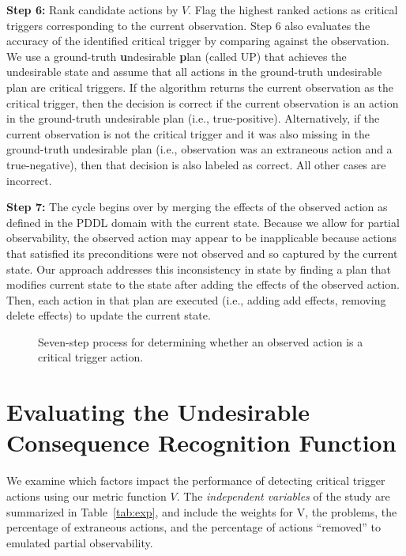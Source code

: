 \textbf{Step 6:} Rank candidate actions by $V$. Flag the highest ranked actions as critical triggers corresponding to the current observation. Step 6 also evaluates the accuracy of the identified critical trigger by comparing against the observation. 
We use a ground-truth \textbf{u}ndesirable \textbf{p}lan (called UP) that achieves the undesirable state and assume that all actions in the ground-truth undesirable plan are critical triggers. 
If the algorithm returns the current observation as the critical trigger, then the decision is correct if the current observation is an action in the ground-truth undesirable plan (i.e., true-positive). 
Alternatively, if the current observation is not the critical trigger and it was also missing in the ground-truth undesirable plan (i.e., observation was an extraneous action and a true-negative), then that decision is also labeled as correct. 
All other cases are incorrect.

\textbf{Step 7:} The cycle begins over by merging the effects of the observed action as defined in the PDDL domain with the current state. 
Because we allow for partial observability, the observed action may appear to be inapplicable because actions that satisfied its preconditions were not observed and so captured by the current state. 
Our approach addresses this inconsistency in state by finding a plan that modifies current state to the state after adding the effects of the observed action. 
Then, each action in that plan are executed (i.e., adding add effects, removing delete effects) to update the current state.

\begin{figure}[t]
\caption{Seven-step process for determining whether an observed action is a critical trigger action.}
\label{fig:components}
\end{figure}

\section{Evaluating the Undesirable Consequence Recognition Function}
We examine which factors impact the performance of detecting critical trigger actions using our metric function $V$. The \emph{independent variables} of the study are summarized in Table~\ref{tab:exp}, and include the weights for V, the problems, the percentage of extraneous actions, and the percentage of actions ``removed'' to emulated partial observability.


